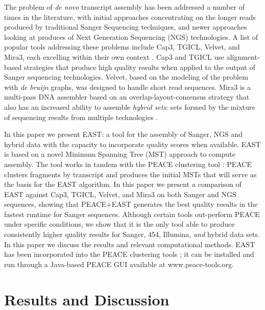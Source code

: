 \documentclass[10pt]{bmc_article}
\newcommand{\peace} {{\small PEACE}}
\newcommand{\capthree} {{\small Cap3}}
\newcommand{\tgicl} {{\small TGICL}}
\newcommand{\east} {{\small EAST}}
\newcommand{\velvet}{{\small Velvet}}
\newcommand{\mira}{{\small Mira3}}
\newcommand{\peast}{{\small PEACE+EAST}}
\newenvironment{bmcformat}{\begin{raggedright}\baselineskip20pt\sloppy\setboolean{publ}{false}}{\end{raggedright}\baselineskip20pt\sloppy}
\begin{document}
\begin{bmcformat}
  \vspace{3mm}

  The problem of {\it de novo} transcript assembly has been addressed
  a number of times in the literature, with initial approaches
  concentrating on the longer reads produced by traditional Sanger
  Sequencing techniques, and newer approaches looking at produces of
  Next Generation Sequencing (NGS) technologies.  A list of popular
  tools addressing these problems include \capthree, \tgicl, \velvet,
  and \mira, each excelling within their own context
  \cite{Huang99,Pertea03,Chevreux04,Zerbino08}.  \capthree\/ and
  \tgicl\/ use alignment-based strategies that produce high quality
  results when applied to the output of Sanger sequencing
  technologies.  \velvet, based on the modeling of the problem with
  {\it de bruijn} graphs, was designed to handle short read sequences.
  \mira\/ is a multi-pass DNA assembler based on an
  overlap-layout-consensus strategy that also has an increased ability
  to assemble {\it hybrid sets}: sets formed by the mixture of
  sequencing results from multiple technologies \cite{MiraWeb}.

\vspace{3mm}

In this paper we present \east: a tool for the assembly of
Sanger, NGS and hybrid data with the capacity to incorporate quality
scores when available.  \east\/ is based on a novel Minimum Spanning
Tree (MST) approach to compute assembly.  The tool works in tandem
with the \peace\/ clustering tool \cite{Rao10}: \peace\/ clusters
fragments by transcript and produces the initial MSTs that will serve
as the basis for the \east\/ algorithm.  In this paper we present a
comparison of \east\/ against \capthree, \tgicl, \velvet, and
\mira\/ on both Sanger and NGS sequences, showing that \peast\/
generates the best quality results in the fastest runtime for Sanger
sequences.  Although certain tools out-perform \peace\/ under
specific conditions, we show that it is the only tool able to produce consistently
higher quality results for Sanger, 454, Illumina, {\it and} hybrid
data sets.  In this paper we discuss the results and relevant
computational methods.  \east\/ has been incorporated into the
\peace\/ clustering tools \cite{Rao10}; it can be installed
and run through a Java-based PEACE GUI available at
www.peace-tools.org.

 
\section*{Results and Discussion}


\end{bmcformat}
\end{document}
